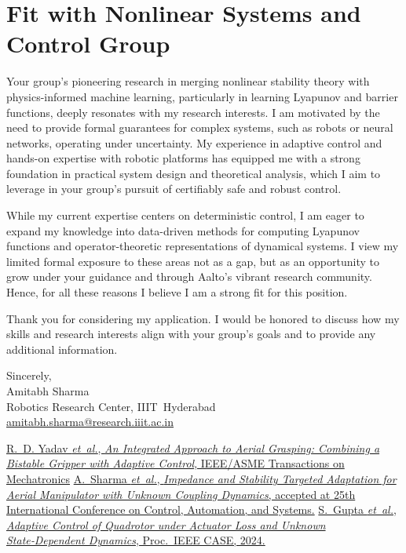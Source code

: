 \section*{Fit with Nonlinear Systems and Control Group}
Your group's pioneering research in merging nonlinear stability theory with physics-informed machine learning, particularly in learning Lyapunov and barrier functions, deeply resonates with my research interests. I am motivated by the need to provide formal guarantees for complex systems, such as robots or neural networks, operating under uncertainty. My experience in adaptive control and hands-on expertise with robotic platforms has equipped me with a strong foundation in practical system design and theoretical analysis, which I aim to leverage in your group’s pursuit of certifiably safe and robust control.

\vspace{4pt}
While my current expertise centers on deterministic control, I am eager to expand my knowledge into data-driven methods for computing Lyapunov functions and operator-theoretic representations of dynamical systems. I view my limited formal exposure to these areas not as a gap, but as an opportunity to grow under your guidance and through Aalto’s vibrant research community. Hence, for all these reasons I believe I am a strong fit for this position.

\vspace{4pt}
Thank you for considering my application. I would be honored to discuss how my skills and research interests align with your group’s goals and to provide any additional information.

\vspace{4pt}
\begin{flushleft}
Sincerely,\\
Amitabh Sharma\\
Robotics Research Center, IIIT~Hyderabad\\
\href{mailto:amitabh.sharma@research.iiit.ac.in}{amitabh.sharma@research.iiit.ac.in}
\end{flushleft}

\vspace{0.5cm}
\begin{thebibliography}{99}
\href{https://ieeexplore.ieee.org/abstract/document/11098573}{R.~D. Yadav \emph{et~al.}, \textit{An Integrated Approach to Aerial Grasping: Combining a Bistable Gripper with Adaptive Control}, IEEE/ASME Transactions on Mechatronics}
\href{https://arxiv.org/abs/2504.01983}{A.~Sharma \emph{et~al.}, \textit{Impedance and Stability Targeted Adaptation for Aerial Manipulator with Unknown Coupling Dynamics}, accepted at 25th International Conference on Control, Automation, and Systems.}
\href{https://ieeexplore.ieee.org/abstract/document/10711418}{S.~Gupta \emph{et~al.}, \textit{Adaptive Control of Quadrotor under Actuator Loss and Unknown State‑Dependent Dynamics}, Proc.\ IEEE CASE, 2024.}
\end{thebibliography}

